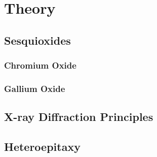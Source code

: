 \chapter{Theory}

\section{Sesquioxides}
    
    \subsection{Chromium Oxide}\label{Sec:Cr2O3}
        
    \subsection{Gallium Oxide}
        

\section{X-ray Diffraction Principles}
    
        \label{Sec:Theory_X-ray_diffraction}

\section{Heteroepitaxy}
    